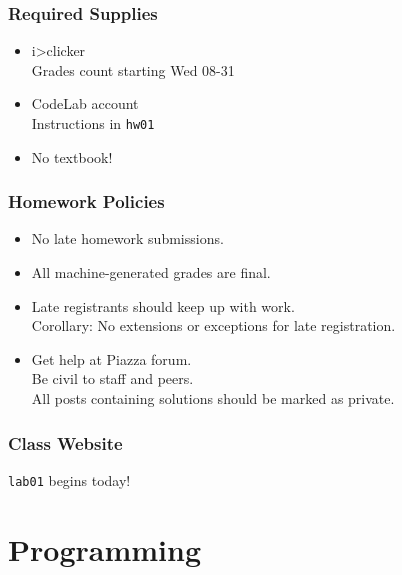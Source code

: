 \documentclass{beamer}
\begin{document}
\begin{frame}
  \frametitle{Required Supplies}
  \begin{itemize}
    \item i>clicker \\ \textcolor{CS101GradBot}{\footnotesize\hspace{1em} Grades count starting Wed 08-31}
    \item CodeLab account \\ \textcolor{CS101GradBot}{\footnotesize\hspace{1em} Instructions in \texttt{hw01}}
    \item No textbook!
  \end{itemize}
\end{frame}

\begin{frame}
  \frametitle{Homework Policies}
  \begin{itemize}
    \item No late homework submissions.
    \item All machine-generated grades are final.
    \item Late registrants should keep up with work. \\ \textcolor{CS101GradBot}{\footnotesize\hspace{1em} Corollary:  No extensions or exceptions for late registration.}
    \item Get help at Piazza forum. \\ \textcolor{CS101GradBot}{\footnotesize\hspace{1em} Be civil to staff and peers. \\ All posts containing solutions should be marked as private.}
  \end{itemize}
\end{frame}

\begin{frame}[plain,c]
  \frametitle{Class Website}
  \begin{center}
    \textcolor{CS101Base}{\Huge \texttt{lab01} begins today!}
  \end{center}
\end{frame}

\section{Programming}
\end{document}
